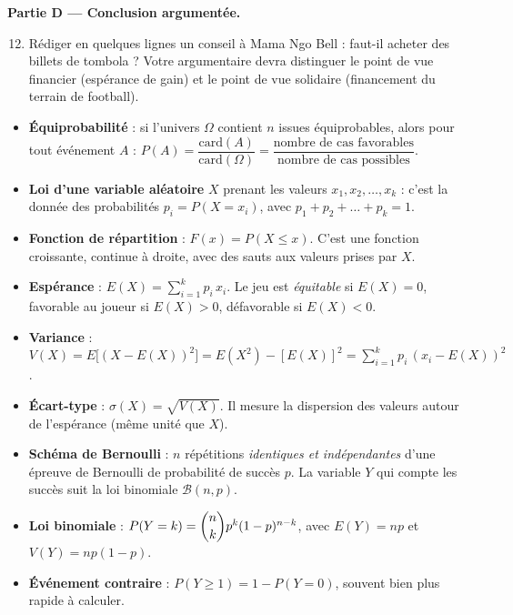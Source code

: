 \documentclass[11pt]{article}
\newcounter{popsec}
\newcounter{popsub}
\newcommand{\courssub}[1]{%
  \stepcounter{popsub}%
  \par\vspace{9pt}\noindent{\popxbold\fontsize{11.5}{13}\selectfont\color{popink}{\color{poporange}\thepopsec.\thepopsub}\hspace{6pt}#1}\par\nopagebreak\vspace{4pt}
}
\begin{document}
\textbf{Partie D — Conclusion argumentée.}

\begin{enumerate}
\setcounter{enumi}{11}
\item Rédiger en quelques lignes un conseil à Mama Ngo Bell : faut-il acheter des billets de tombola ? Votre argumentaire devra distinguer le point de vue financier (espérance de gain) et le point de vue solidaire (financement du terrain de football).
\end{enumerate}

\courssub{Ressources à mobiliser}

\begin{aretenir}
\begin{itemize}
\item \textbf{Équiprobabilité} : si l'univers $\Omega$ contient $n$ issues équiprobables, alors pour tout événement $A$ : $P(A) = \dfrac{\text{card}(A)}{\text{card}(\Omega)} = \dfrac{\text{nombre de cas favorables}}{\text{nombre de cas possibles}}$.
\item \textbf{Loi d'une variable aléatoire} $X$ prenant les valeurs $x_1, x_2, \dots, x_k$ : c'est la donnée des probabilités $p_i = P(X = x_i)$, avec $p_1 + p_2 + \dots + p_k = 1$.
\item \textbf{Fonction de répartition} : $F(x) = P(X \le x)$. C'est une fonction croissante, continue à droite, avec des sauts aux valeurs prises par $X$.
\item \textbf{Espérance} : $E(X) = \displaystyle\sum_{i=1}^{k} p_i\, x_i$. Le jeu est \emph{équitable} si $E(X) = 0$, favorable au joueur si $E(X) > 0$, défavorable si $E(X) < 0$.
\item \textbf{Variance} : $V(X) = E\bigl[(X - E(X))^2\bigr] = E(X^2) - [E(X)]^2 = \displaystyle\sum_{i=1}^{k} p_i\, (x_i - E(X))^2$.
\item \textbf{Écart-type} : $\sigma(X) = \sqrt{V(X)}$. Il mesure la dispersion des valeurs autour de l'espérance (même unité que $X$).
\item \textbf{Schéma de Bernoulli} : $n$ répétitions \emph{identiques et indépendantes} d'une épreuve de Bernoulli de probabilité de succès $p$. La variable $Y$ qui compte les succès suit la loi binomiale $\mathcal{B}(n, p)$.
\item \textbf{Loi binomiale} : $P(Y = k) = \dbinom{n}{k} p^k (1-p)^{n-k}$, avec $E(Y) = np$ et $V(Y) = np(1-p)$.
\item \textbf{Événement contraire} : $P(Y \geq 1) = 1 - P(Y = 0)$, souvent bien plus rapide à calculer.
\end{itemize}
\end{aretenir}
\end{document}
